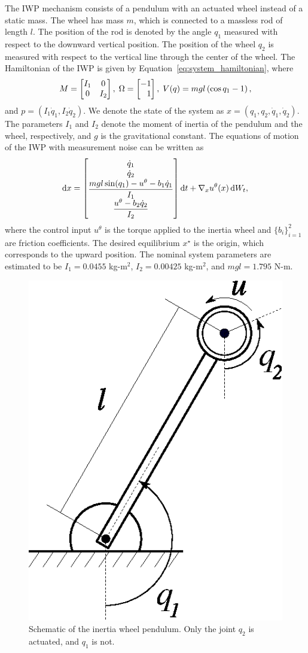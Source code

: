 The IWP mechanism consists of a pendulum with an actuated wheel instead of a
static mass.
%
The wheel has mass $m$, which is connected to a massless rod of length \(l\). 
%
The position of the rod is denoted by the angle \(q_1\) measured with
respect to the downward vertical position.
%
The position of the wheel \(q_2\) is measured with respect to the vertical
line through the center of the wheel.
%
The Hamiltonian of the IWP is given by Equation~\eqref{eq:system_hamiltonian}, where
%
\begin{equation*}
    M = \begin{bmatrix}I_1 & 0 \\ 0 & I_2\end{bmatrix},
    \;
    \Omega = \begin{bmatrix}-1 \\ \phantom{-}1\end{bmatrix},
    \;
    V(q) = mgl \left( \cos q_1 - 1 \right),
\end{equation*}
%
and $p = \left(I_1 \dot{q}_1,I_2 \dot{q}_2\right)$. 
%
We denote the state of the system as $x = (q_1, q_2, \dot{q}_1, \dot{q}_2)$.
%
The parameters \(I_1\) and \(I_2\) denote the moment of inertia of the pendulum
and the wheel, respectively, and \(g\) is the gravitational constant.
%
The equations of motion of the IWP with measurement noise can be written as 
%
\begin{equation}
    \operatorname{d}\! x = \begin{bmatrix}\dot{q}_1 \\ \dot{q}_2 \\ \dfrac{mgl \sin(q_1) - u^\theta - b_1\dot{q}_1}{I_1} \\ \dfrac{u^\theta - b_2 \dot{q}_2}{I_2}\end{bmatrix} \operatorname{d}\! t + \nabla_x u^\theta(x) \operatorname{d}\! W_t, 
    \label{eq:iwp_dynamics}
\end{equation}
%
where the control input \(u^\theta\) is the torque applied to the inertia wheel
and $\{b_i\}_{i=1}^2$ are friction coefficients.
%
The desired equilibrium $x^\star$ is the origin, which corresponds to the upward
position.
%
The nominal system parameters are estimated to be $I_1 = 0.0455$ kg-m$^2$, $I_2
= 0.00425$ kg-m$^2$, and $mgl = 1.795$ N-m. 
%
%

\begin{figure}[t]
    \centering
    \includegraphics[width=0.25\linewidth]{figures/iwp.eps}
    \caption{Schematic of the inertia wheel pendulum. Only the joint $q_2$ is actuated, and $q_1$ is not.}
    \label{fig:iwp}
\end{figure}

